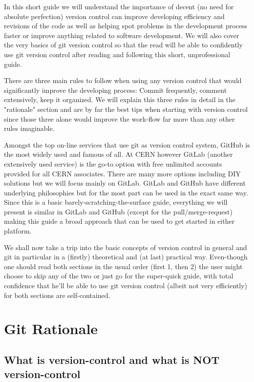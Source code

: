 \documentclass[runningheads,a4paper]{llncs}
\begin{document}
In this short guide we will understand the importance of decent (no need for absolute perfection) version control can improve developing efficiency and revisions of the code as well as helping spot problems in the development process faster or improve anything related to software development. We will also cover the very basics of git version control so that the read will be able to confidently use git version control after reading and following this short, unprofessional guide.

There are three main rules to follow when using any version control that would significantly improve the developing process: Commit frequently, comment extensively, keep it organized. We will explain this three rules in detail in the "rationale" section and are by far the best tips when  starting with version control since those three alone would improve the work-flow far more than any other rules imaginable. 

Amongst the top on-line services that use git as version control system, GitHub is the most widely used and famous of all. At CERN however GitLab (another extensively used service) is the go-to option with free unlimited accounts provided for all CERN associates. There are many more options including DIY solutions but we will focus mainly on GitLab. GitLab and GitHub have different underlying philosophies but for the most part can be used in the exact same way. Since this is a basic barely-scratching-the-surface guide, everything we will present is similar in GitLab and GitHub (except for the pull/merge-request) making this guide a broad approach that can be used to get started in either platform.

We shall now take a trip into the basic concepts of version control in general and git in particular in a (firstly) theoretical and (at last) practical way. Even-though one should read both sections in the usual order (first 1, then 2) the user might choose to skip any of the two or just go for the super-quick guide, with total confidence that he'll be able to use git version control (albeit not very efficiently) for both sections are self-contained.


\section{Git Rationale}


\subsection{What is version-control and what is NOT version-control}
\end{document}
